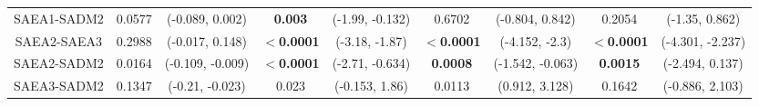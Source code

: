 \begin{landscape}
\begin{table}[]
\begin{tabular}{ccccccccc}
					SAEA1-SADM2 & 0.0577 & (-0.089, 0.002) & \textbf{0.003} & (-1.99, -0.132) &  0.6702  & (-0.804, 0.842) & 0.2054  & (-1.35, 0.862) \\\rowcolor{gray2}
					SAEA2-SAEA3 & 0.2988 & (-0.017, 0.148) & $\boldsymbol{<}$\textbf{0.0001} & (-3.18, -1.87) & $\boldsymbol{<}$\textbf{0.0001} & (-4.152, -2.3) & $\boldsymbol{<}$\textbf{0.0001} & (-4.301, -2.237) \\\rowcolor{gray1}
					SAEA2-SADM2 & 0.0164 & (-0.109, -0.009) & $\boldsymbol{<}$\textbf{0.0001} & (-2.71, -0.634) & \textbf{0.0008} & (-1.542, -0.063) & \textbf{0.0015} & (-2.494, 0.137) \\\rowcolor{gray2}
					SAEA3-SADM2 & 0.1347 & (-0.21, -0.023) & 0.023 & (-0.153, 1.86) & 0.0113 & (0.912, 3.128) & 0.1642 & (-0.886, 2.103)
				\end{tabular}
				\label{tab:results:benchmark:zetaeoe:pvalues}
			\end{table}
		

\end{landscape}
